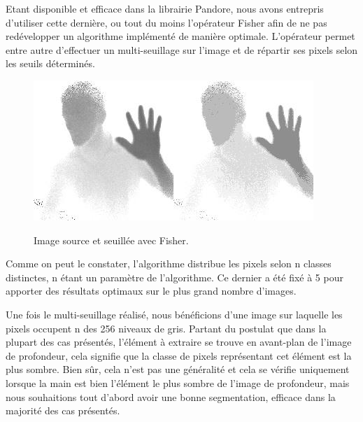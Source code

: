 	Etant disponible et efficace dans la librairie Pandore, nous avons entrepris d’utiliser cette dernière, ou tout du moins l’opérateur Fisher afin de ne pas redévelopper un algorithme implémenté de manière optimale. L’opérateur permet entre autre d’effectuer un multi-seuillage sur l’image et de répartir ses pixels selon les seuils déterminés.

\begin{figure}[htb!]
\centerline{\includegraphics[scale=0.6]{fisherIn.jpg}\includegraphics[scale=0.6]{fisherOut.jpg}}
\caption{Image source et seuillée avec Fisher.}
\end{figure}

Comme on peut le constater, l’algorithme distribue les pixels selon n classes distinctes, n étant un paramètre de l’algorithme. Ce dernier a été fixé à 5 pour apporter des résultats optimaux sur le plus grand nombre d’images.

	Une fois le multi-seuillage réalisé, nous bénéficions d’une image sur laquelle les pixels occupent n des 256 niveaux de gris. Partant du postulat que dans la plupart des cas présentés, l’élément à extraire se trouve en avant-plan de l’image de profondeur, cela signifie que la classe de pixels représentant cet élément est la plus sombre. Bien sûr, cela n’est pas une généralité et cela se vérifie uniquement lorsque la main est bien l’élément le plus sombre de l’image de profondeur, mais nous souhaitions tout d’abord avoir une bonne segmentation, efficace dans la majorité des cas présentés. 

